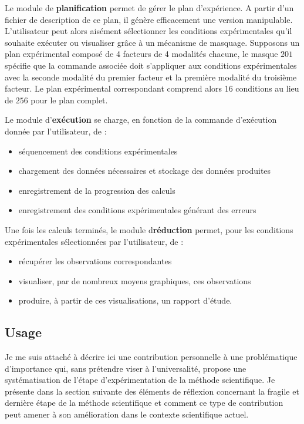 Le module de \textbf{planification} permet de gérer le plan d'expérience. A partir d'un fichier de description de ce plan, il génère efficacement une version manipulable. L'utilisateur peut alors aisément sélectionner les conditions expérimentales qu'il souhaite exécuter ou visualiser grâce à un mécanisme de masquage. Supposons un plan expérimental composé de 4 facteurs de 4 modalités chacune, le masque ${2 0 1}$ spécifie que la commande associée doit s'appliquer aux conditions expérimentales avec la seconde modalité du premier facteur et la première modalité du troisième facteur. Le plan expérimental correspondant comprend alors 16 conditions au lieu de  $256$ pour le plan complet.

Le module d'\textbf{exécution} se charge, en fonction de la commande d'exécution donnée par l'utilisateur, de :
\begin{itemize}
  \item séquencement des conditions expérimentales
  \item chargement des données nécessaires et stockage des données produites
  \item enregistrement de la progression des calculs
  \item enregistrement des conditions expérimentales générant des erreurs
\end{itemize}

Une fois les calculs terminés, le module d\textbf{réduction} permet, pour les conditions expérimentales sélectionnées par l'utilisateur, de :
\begin{itemize}
  \item récupérer les observations correspondantes
  \item visualiser, par de nombreux moyens graphiques, ces observations
  \item produire, à partir de ces visualisations, un rapport d'étude.
\end{itemize}

\subsection{\nmu Usage}



Je me suis attaché à décrire ici une contribution personnelle à une problématique d'importance qui, sans prétendre viser à l'universalité, propose une systématisation de l'étape d'expérimentation de la méthode scientifique. Je présente dans la section suivante des éléments de réflexion concernant la fragile et dernière étape de la méthode scientifique et comment ce type de contribution peut amener à son amélioration dans le contexte scientifique actuel.

